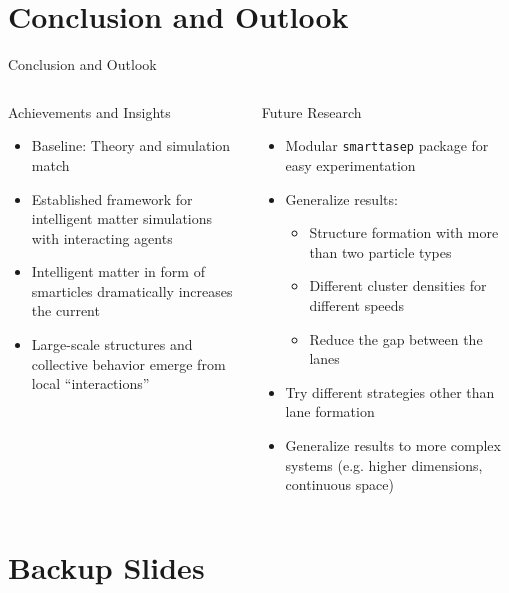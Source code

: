 \documentclass[10pt,xcolor=table, aspectratio=1610]{beamer}
\begin{document}
\section{Conclusion and Outlook}
\begin{frame}{Conclusion and Outlook}
  \begin{columns}
    \begin{block}{Achievements and Insights}
      \begin{itemize}
        \item Baseline: Theory and simulation match
        \item Established framework for intelligent matter simulations with interacting agents
        \item Intelligent matter in form of smarticles dramatically increases the current
        \item Large-scale structures and collective behavior emerge from local \enquote{interactions}
      \end{itemize}
    \end{block}
    \begin{block}{Future Research}
      \begin{itemize}
        \item Modular \texttt{smarttasep} package for easy experimentation
        \item Generalize results:
        \begin{itemize}
          \item Structure formation with more than two particle types
          \item Different cluster densities for different speeds
          \item Reduce the gap between the lanes
        \end{itemize}
        \item Try different strategies other than lane formation
        \item Generalize results to more complex systems (e.g. higher dimensions, continuous space)
      \end{itemize}
    \end{block}
  \end{columns}
\end{frame}

\appendix
\section*{Backup Slides}
\end{document}
